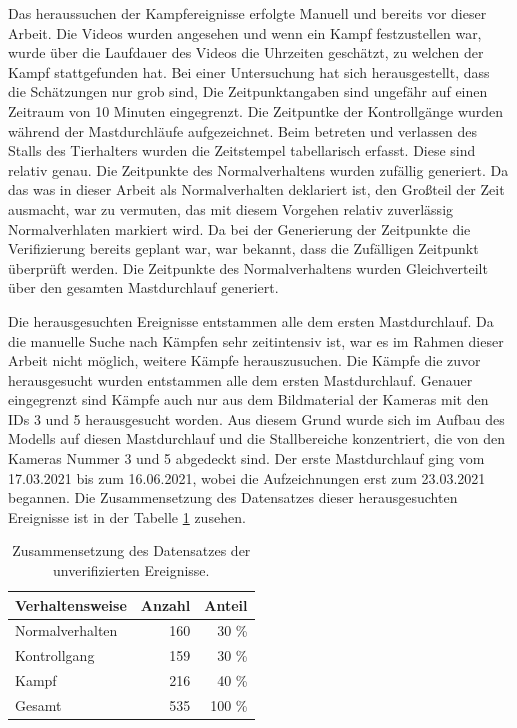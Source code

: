 Das heraussuchen der Kampfereignisse erfolgte Manuell und bereits vor dieser Arbeit. Die Videos wurden angesehen und wenn ein Kampf festzustellen war, wurde über die Laufdauer des Videos die Uhrzeiten geschätzt, zu welchen der Kampf stattgefunden hat. Bei einer Untersuchung hat sich herausgestellt, dass die Schätzungen nur grob sind, Die Zeitpunktangaben sind ungefähr auf einen Zeitraum von 10 Minuten eingegrenzt. Die Zeitpuntke der Kontrollgänge wurden während der Mastdurchläufe aufgezeichnet. Beim betreten und verlassen des Stalls des Tierhalters wurden die Zeitstempel tabellarisch erfasst. Diese sind relativ genau. Die Zeitpunkte des Normalverhaltens wurden zufällig generiert. Da das was in dieser Arbeit als Normalverhalten deklariert ist, den Großteil der Zeit ausmacht, war zu vermuten, das mit diesem Vorgehen relativ zuverlässig Normalverhlaten markiert wird. Da bei der Generierung der Zeitpunkte die Verifizierung bereits geplant war, war bekannt, dass die Zufälligen Zeitpunkt überprüft werden. Die Zeitpunkte des Normalverhaltens wurden Gleichverteilt über den gesamten Mastdurchlauf generiert.\par

Die herausgesuchten Ereignisse entstammen alle dem ersten Mastdurchlauf. Da die manuelle Suche nach Kämpfen sehr zeitintensiv ist, war es im Rahmen dieser Arbeit nicht möglich, weitere Kämpfe herauszusuchen. Die Kämpfe die zuvor herausgesucht wurden entstammen alle dem ersten Mastdurchlauf. Genauer eingegrenzt sind Kämpfe auch nur aus dem Bildmaterial der Kameras mit den IDs 3 und 5 herausgesucht worden. Aus diesem Grund wurde sich im Aufbau des Modells auf diesen Mastdurchlauf und die Stallbereiche konzentriert, die von den Kameras Nummer 3 und 5 abgedeckt sind. Der erste Mastdurchlauf ging vom 17.03.2021 bis zum 16.06.2021, wobei die Aufzeichnungen erst zum 23.03.2021 begannen. Die Zusammensetzung des Datensatzes dieser herausgesuchten Ereignisse ist in der Tabelle \ref{tab:DataSetUnVeri} zusehen.\par


\begin{table}[ht]
    \centering
    \caption{Zusammensetzung des Datensatzes der unverifizierten Ereignisse.}
    \begin{tabular}{|l|r|r|}
    \hline
        Verhaltensweise & Anzahl & Anteil \\
    \hline
        Normalverhalten & 160 & 30 \%\\
        Kontrollgang & 159 & 30 \%\\
        Kampf & 216 & 40 \%\\
    \hline
    \hline
        Gesamt & 535 & 100 \%\\
    \hline
    \end{tabular}
    \label{tab:DataSetUnVeri}
\end{table}


